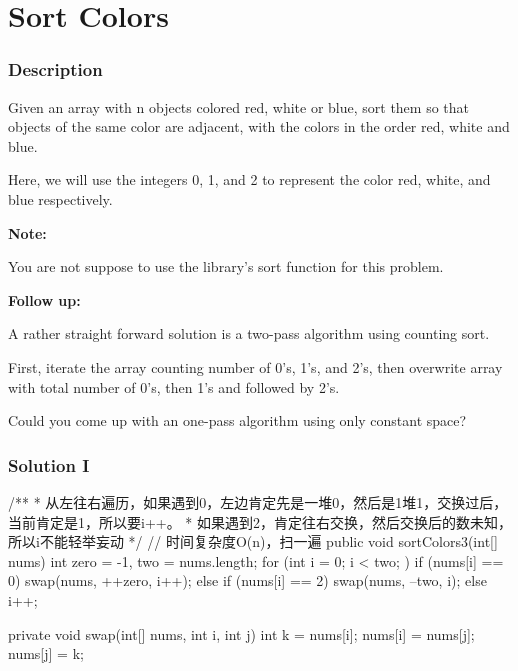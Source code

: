 \newpage

\section{Sort Colors} %

\subsubsection{Description}
Given an array with n objects colored red, white or blue, sort them so that objects of the same color are adjacent, with the colors in the order red, white and blue.

Here, we will use the integers 0, 1, and 2 to represent the color red, white, and blue respectively.

\textbf{Note:}

You are not suppose to use the library's sort function for this problem.

\textbf{Follow up:}

A rather straight forward solution is a two-pass algorithm using counting sort.

First, iterate the array counting number of 0's, 1's, and 2's, then overwrite array with total number of 0's, then 1's and followed by 2's.

Could you come up with an one-pass algorithm using only constant space?

\subsubsection{Solution I}

\begin{Code}
/**
 * 从左往右遍历，如果遇到0，左边肯定先是一堆0，然后是1堆1，交换过后，当前肯定是1，所以要i++。
 * 如果遇到2，肯定往右交换，然后交换后的数未知，所以i不能轻举妄动
 */
// 时间复杂度O(n)，扫一遍
public void sortColors3(int[] nums) {
    int zero = -1, two = nums.length;
    for (int i = 0; i < two; ) {
        if (nums[i] == 0) {
            swap(nums, ++zero, i++);
        } else if (nums[i] == 2) {
            swap(nums, --two, i);
        } else {
            i++;
        }
    }
}

private void swap(int[] nums, int i, int j) {
    int k = nums[i];
    nums[i] = nums[j];
    nums[j] = k;
}
\end{Code}

